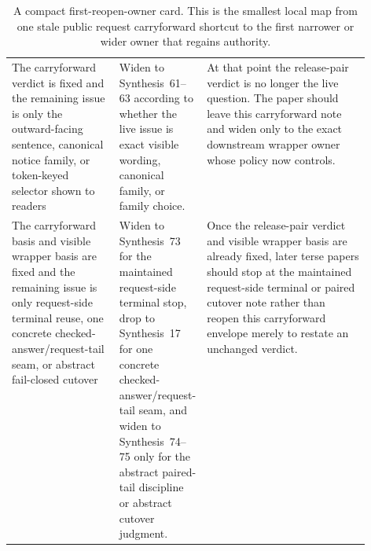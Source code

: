 \documentclass[11pt]{article}
\begin{document}
\begin{table}[t]
\begin{tabularx}{\linewidth}{@{}p{0.30\linewidth}p{0.23\linewidth}X@{}}
The carryforward verdict is fixed and the remaining issue is only the outward-facing sentence, canonical notice family, or token-keyed selector shown to readers & Widen to Synthesis~61--63 according to whether the live issue is exact visible wording, canonical family, or family choice. & At that point the release-pair verdict is no longer the live question. The paper should leave this carryforward note and widen only to the exact downstream wrapper owner whose policy now controls. \\
The carryforward basis and visible wrapper basis are fixed and the remaining issue is only request-side terminal reuse, one concrete checked-answer/request-tail seam, or abstract fail-closed cutover & Widen to Synthesis~73 for the maintained request-side terminal stop, drop to Synthesis~17 for one concrete checked-answer/request-tail seam, and widen to Synthesis~74--75 only for the abstract paired-tail discipline or abstract cutover judgment. & Once the release-pair verdict and visible wrapper basis are already fixed, later terse papers should stop at the maintained request-side terminal or paired cutover note rather than reopen this carryforward envelope merely to restate an unchanged verdict. \\
\bottomrule
\end{tabularx}
\caption{A compact first-reopen-owner card. This is the smallest local map from one stale public request carryforward shortcut to the first narrower or wider owner that regains authority.}
\label{tab:first-reopen-owner-card-public-request-carryforward}
\end{table}
\end{document}
